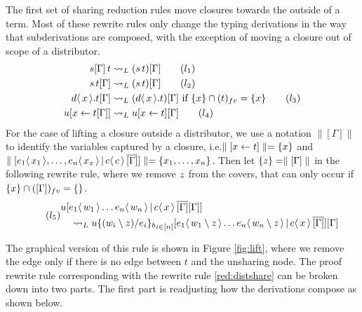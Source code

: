 \documentclass[runningheads]{llncs}
\let\vec\relax
\newcommand{\fv}[1]{(#1)_{fv}}
\newcommand{\set}[1]{ \{ #1 \} }
\newcommand{\app}[2]{#1 \, #2}
\newcommand{\fake}[3]{#1 \langle \, #2 \, \rangle . #3}
\newcommand{\share}[3]{#1 [#2 \leftarrow #3]}
\newcommand{\dist}[5]{#1 [ #2 \, \vert \, \fakedist{#4}{#5} \, #3 ]}
\newcommand{\fakedist}[2]{#1 \langle \, #2 \, \rangle}
\newcommand{\psub}[3]{#1 \{ #2 / #3 \}_{b}}
\newcommand{\bindvars}[1]{\parallel#1\parallel}
\begin{document}
The first set of sharing reduction rules move closures towards the outside of a term. Most of these rewrite rules only change the typing derivations in the way that subderivations are composed, with the exception of moving a closure out of scope of a distributor.
\begin{align}
\app{s[\Gamma]}{t} &\rightsquigarrow_{L} (\app{s}{t})[\Gamma]   \label{red:liftappleft} \tag{$l_{1}$} \\
\app{s}{t[\Gamma]} &\rightsquigarrow_{L} (\app{s}{t})[\Gamma] \label{red:liftappright} \tag{$l_{2}$} \\
\fake{d}{\vec{x}}{t[\Gamma]} &\rightsquigarrow_{L} (\fake{d}{\vec{x}}{t})[\Gamma]  \text{ if } \set{\vec{x}} \cap \fv{t} = \set{\vec{x}}  \label{red:liftabs} \tag{$l_{3}$} \\
\share{u}{\vec{x}}{t[\Gamma]} &\rightsquigarrow_{L} \share{u}{\vec{x}}{t}[\Gamma] \label{red:liftshare} \tag{$l_{4}$}
\end{align}
For the case of lifting a closure outside a distributor, we use a notation $\bindvars{[\Gamma]}$ to identify the variables captured by a closure, i.e.$\bindvars{\share{}{\vec{x}}{t}} = \set{\vec{x}}$ and \\ $\bindvars{\dist{}{\fakedist{e_{1}}{\vec{x_{1}}}, \dots, \fakedist{e_{n}}{\vec{x_{x}}}}{\overline{[\Gamma]}}{c}{c}} = \set{\vec{x_{1}}, \dots, \vec{x_{n}}}$. Then let $\set{\vec{z}} = \bindvars{[\Gamma]}$ in the following rewrite rule, where we remove $\vec{z}$ from the covers, that can only occur if $\set{\vec{x}} \cap \fv{[\Gamma]} = \set{}$.
\begin{equation} \label{red:distshare} \tag{$l_{5}$}
\begin{multlined}
\dist{u}{\fakedist{e_{1}}{\vec{w_{1}}} \dots \fakedist{e_{n}}{\vec{w_{n}}}}{\overline{[\Gamma]} [\Gamma]}{c}{\vec{x}} \\ \rightsquigarrow_{L} \dist{u {\psub{}{(\vec{w_{i}} \setminus \vec{z})}{e_{i}}}_{i \in [n]}}{\fakedist{e_{1}}{\vec{w_{1}} \setminus \vec{z}} \dots \fakedist{e_{n}}{\vec{w_{n}} \setminus \vec{z}}}{\overline{[\Gamma]}}{c}{\vec{x}}[\Gamma]
\end{multlined}
\end{equation}

The graphical version of this rule is shown in Figure \ref{fig:lift}, where we remove the edge only if there is no edge between $t$ and the unsharing node. The proof rewrite rule corresponding with the rewrite rule \ref{red:distshare} can be broken down into two parts. The first part is readjusting how the derivations compose as shown below.
\end{document}

